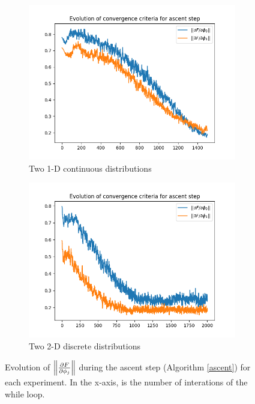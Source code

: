  \begin{figure}
    \begin{subfigure}{.5\textwidth}
        \centering
        \includegraphics[width=\textwidth]{figures/ascent_criteria_msamples16000_iter0_1D_2skewnorm.png}
        \caption{Two 1-D continuous distributions}
    \end{subfigure}
    \begin{subfigure}{.5\textwidth}
        \centering
        \includegraphics[width=\textwidth]{figures/ascent_criteria_msamples16000_iter0_2D_discrete.png}
        \caption{Two 2-D discrete distributions }
    \end{subfigure}
    \caption{Evolution of $\left\lVert \frac{\partial F}{\partial \phi_j} \right\rVert$ during the ascent step (Algorithm \ref{ascent}) for each experiment. In the x-axis, is the number of interations of the while loop.}
    \label{fig:ascent_criteria}
\end{figure}


